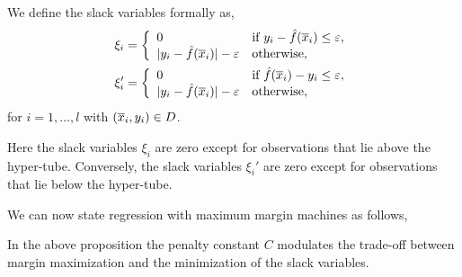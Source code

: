 \documentclass[a4paper,blends,pdf,colorBG,slideColor]{prosper}
\begin{document}

We define the slack variables formally as,
\begin{align*}
\xi_i &= \left \{
	\begin{array}{ll}
	0 & \text{if $y_i - \hat{f}(\overline{x}_i) \le \varepsilon$},\\
	|{y_i - \hat{f}(\overline{x}_i)}| - \varepsilon & \text{otherwise},
	\end{array}
	\right .\\
\xi_i' &= \left \{
	\begin{array}{ll}
	0 & \text{if $\hat{f}(\overline{x}_i) - y_i \le \varepsilon$},\\
	|{y_i - \hat{f}(\overline{x}_i)}| - \varepsilon & \text{otherwise},
	\end{array}
	\right .	
\end{align*}
for $i = 1,\ldots,l$ with $(\overline{x}_i,y_i)\in D$.

Here the slack variables $\xi_i$ are zero except for observations that lie above the hyper-tube.
Conversely, the slack variables $\xi_i'$ are zero except for observations that lie below the
hyper-tube.

\es

\small
We can now state regression with maximum margin machines as follows,


In the above proposition the penalty constant $C$ modulates the trade-off between margin maximization and
the minimization of the slack variables.
\es
\end{document}
